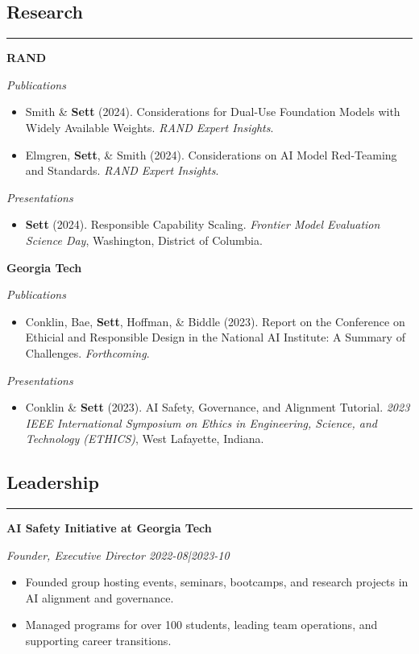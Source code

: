 \documentclass{article}
\newcommand{\headingOne}[1]{
    \subsection*{#1} \hrule
    \vspace*{6pt}
}
\newcommand{\headingTwo}[2]{
    \vspace*{6pt}
    \textbf{#1 \hfill #2}
}
\newcommand{\headingThree}[2]{
    \vspace*{2pt}
    \textsl{#1 \hfill #2}
}
\begin{document}
\headingOne{Research}

\headingTwo{RAND}{}

\headingThree{Publications}{}
\begin{itemize}
    \item Smith \& \textbf{Sett} (2024). Considerations for Dual-Use Foundation Models with Widely Available Weights. \textsl{RAND Expert Insights}.
    \item Elmgren, \textbf{Sett}, \& Smith (2024). Considerations on AI Model Red-Teaming and Standards. \textsl{RAND Expert Insights}.
\end{itemize}

\headingThree{Presentations}{}
\begin{itemize}
    \item \textbf{Sett} (2024). Responsible Capability Scaling. \textsl{Frontier Model Evaluation Science Day}, Washington, District of Columbia.
\end{itemize}

\headingTwo{Georgia Tech}{}

\headingThree{Publications}{}
\begin{itemize}
    \item Conklin, Bae, \textbf{Sett}, Hoffman, \& Biddle (2023). Report on the Conference on Ethicial and Responsible Design in the National AI Institute: A Summary of Challenges. \textsl{Forthcoming}.
\end{itemize}

\headingThree{Presentations}{}
\begin{itemize}
    \item Conklin \& \textbf{Sett} (2023). AI Safety, Governance, and Alignment Tutorial. \textsl{2023 IEEE International Symposium on Ethics in Engineering, Science, and Technology (ETHICS)}, West Lafayette, Indiana.
\end{itemize}


\headingOne{Leadership}


\headingTwo{AI Safety Initiative at Georgia Tech}{}

\headingThree{Founder, Executive Director}{2022-08|2023-10}
\begin{itemize}
    \item Founded group hosting events, seminars, bootcamps, and research projects in AI alignment and governance.
    \item Managed programs for over 100 students, leading team operations, and supporting career transitions.
\end{itemize}
\end{document}
